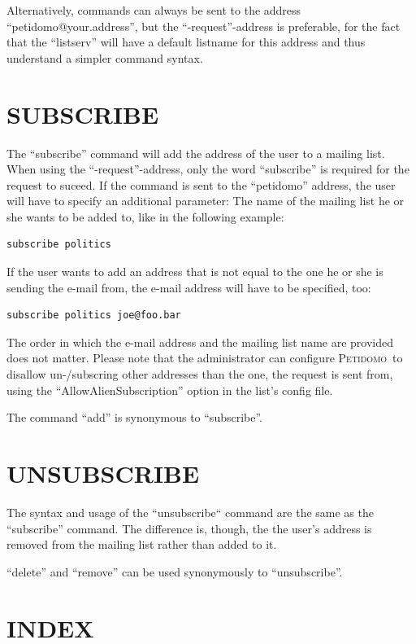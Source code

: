 \documentclass[a4paper,10pt]{scrreprt}
\newcommand{\Petidomo}{{\scshape Peti\-domo}}
\begin{document}
Alternatively, commands can always be sent to the address
``peti\-do\-mo@your.ad\-dress'', but the ``-request''-address is preferable,
for the fact that the ``listserv'' will have a default listname for
this address and thus understand a simpler command syntax.

\section{SUBSCRIBE}

The ``subscribe'' command will add the address of the user to a
mailing list. When using the ``-request''-address, only the word
``subscribe'' is required for the request to suceed. If the command is
sent to the ``petidomo'' address, the user will have to specify an
additional parameter: The name of the mailing list he or she wants to
be added to, like in the following example:
\begin{verbatim}
subscribe politics
\end{verbatim}

If the user wants to add an address that is not equal to the one he or
she is sending the e-mail from, the e-mail address will have to be
specified, too:
\begin{verbatim}
subscribe politics joe@foo.bar
\end{verbatim}

The order in which the e-mail address and the mailing list name are
provided does not matter. Please note that the administrator can
configure \Petidomo\ to disallow un-/subscring other addresses than
the one, the request is sent from, using the
``AllowAlienSubscription'' option in the list's config file.

The command ``add'' is synonymous to ``subscribe''.

\section{UNSUBSCRIBE}

The syntax and usage of the ``unsubscribe`` command are the same as the
``subscribe'' command. The difference is, though, the the user's address
is removed from the mailing list rather than added to it.

``delete'' and ``remove'' can be used synonymously to ``unsubscribe''.

\section{INDEX}
\end{document}
